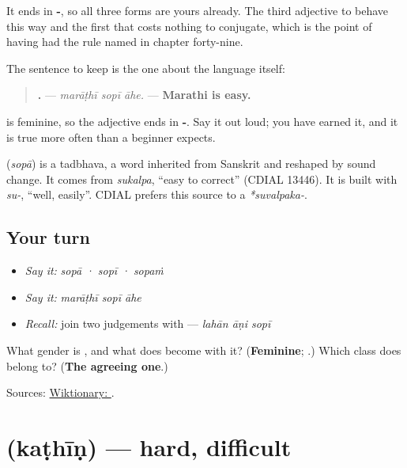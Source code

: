 It ends in \textbf{-}, so all three forms are yours already. The third adjective to behave this way and the first that costs nothing to conjugate, which is the point of having had the rule named in chapter forty-nine.

The sentence to keep is the one about the language itself:

\begin{quote}
\textbf{  .} — \emph{marāṭhī sopī āhe.} — \textbf{Marathi is easy.}
\end{quote}

\textbf{} is feminine, so the adjective ends in \textbf{-}. Say it out loud; you have earned it, and it is true more often than a beginner expects.

\begin{cousinweb}
\textbf{} (\emph{sopā}) is a tadbhava, a word inherited from Sanskrit and reshaped by sound change. It comes from \emph{sukalpa}, \textquotedblleft{}easy to correct\textquotedblright{} (CDIAL 13446). It is built with \emph{su-}, \textquotedblleft{}well, easily\textquotedblright{}. CDIAL prefers this source to a \emph{*suvalpaka-}.
\end{cousinweb}

\subsection*{Your turn}
\begin{itemize}
\raggedright
  \item \emph{Say it:} \emph{sopā · sopī · sopaṁ}
  \item \emph{Say it:} \emph{marāṭhī sopī āhe}
  \item \emph{Recall:} join two judgements with \textbf{} — \emph{lahān āṇi sopī}
\end{itemize}

\begin{tcolorbox}[breakable,colback=teal!4,colframe=teal!35!black,title={Before you move on}]
What gender is \textbf{}, and what does \textbf{} become with it? (\textbf{Feminine}; \textbf{}.) Which class does \textbf{} belong to? (\textbf{The agreeing one}.)

Sources: \href{https://en.wiktionary.org/wiki/\%E0\%A4\%B8\%E0\%A5\%8B\%E0\%A4\%AA\%E0\%A4\%BE}{Wiktionary: }.
\end{tcolorbox}
\section[\texorpdfstring{\mr{कठीण} (kaṭhīṇ)}{कठीण (kaṭhīṇ)}]{ (kaṭhīṇ) — hard, difficult}

